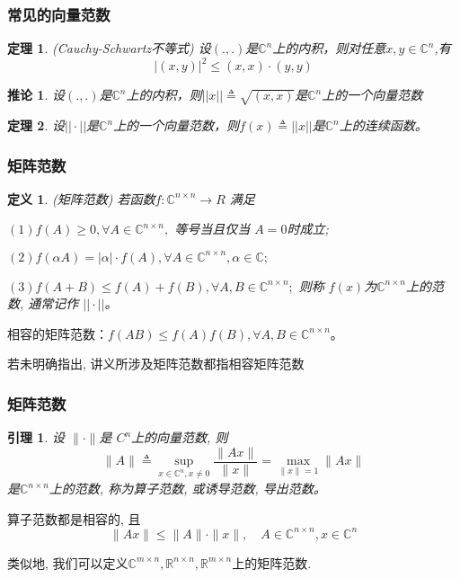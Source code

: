 \documentclass[notheorems,serif]{beamer}
\newcommand{\hei}[1]{{\HEI#1}}
\newtheorem{theorem}{\hei{定理}}
\newtheorem{definition}{\hei{定义}}
\newtheorem{lemma}{\hei{引理}}
\newtheorem{corollary}{\hei{推论}}
\begin{document}
\begin{frame}
\frametitle{常见的向量范数}
\begin{theorem}(Cauchy-Schwartz不等式)
	设$(.,.)$是$\mathbb{C}^{n}$上的内积，则对任意$x,y \in \mathbb{C}^{n}$,有
	$$
	|(x, y)|^{2} \leq(x, x) \cdot(y, y)
	$$
\end{theorem}

\begin{corollary}
	设$(.,.)$是$\mathbb{C}^{n}$上的内积，则$||x||\triangleq \sqrt{(x,x)}$是$\mathbb{C}^{n}$上的一个向量范数
\end{corollary}

\begin{theorem}
	设$||\cdot||$是$\mathbb{C}^{n}$上的一个向量范数，则$f(x)\triangleq||x||$是$\mathbb{C}^{n}$上的连续函数。
\end{theorem}
\end{frame}

\begin{frame}
\frametitle{矩阵范数}
\begin{definition}(矩阵范数)
	若函数$f : \mathbb{C}^{n \times n} \to R$ 满足
	
	$(1) f(A) \geq 0, \forall  A \in \mathbb{C}^{n \times n},$ 等号当且仅当 $A = 0$时成立;
	
	$(2) f(\alpha A) = |\alpha| · f(A), ∀ A \in \mathbb{C}^{n\times n}, α \in \mathbb{C};$
	
	$(3) f(A + B) \leq f(A) + f(B), \forall A, B \in \mathbb{C}^{n \times n};$
	则称 $f(x) $为$\mathbb{C}
	^{n \times n} $上的范数, 通常记作 $|| \cdot ||$。
\end{definition}

相容的矩阵范数：$f(AB) \leq f(A)f(B), \forall A, B \in  \mathbb{C}^{n \times n}$。

若未明确指出, 讲义所涉及矩阵范数都指相容矩阵范数
\end{frame}

\begin{frame}
\frametitle{矩阵范数}
\begin{lemma}
	设 $∥ · ∥ $是 $C^{n}$上的向量范数, 则
	$$
	\|A\| \triangleq \sup _{x \in \mathbb{C}^{n}, x \neq 0} \frac{\|A x\|}{\|x\|}=\max _{\|x\|=1}\|A x\|
	$$
	是$\mathbb{C}
	^{n \times n} $上的范数, 称为算子范数, 或诱导范数, 导出范数。
\end{lemma}

 算子范数都是相容的, 且$$ \|A x\| \leq\|A\| \cdot\|x\|, \quad A \in \mathbb{C}^{n \times n}, x \in \mathbb{C}^{n}$$

 类似地, 我们可以定义$\mathbb{C}^{m \times n}, \mathbb{R}^{n \times n}, \mathbb{R}^{m \times n}$上的矩阵范数.
\end{frame}
\end{document}
